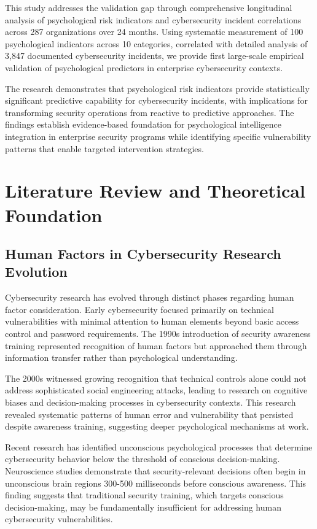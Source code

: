 \documentclass[10pt, twocolumn]{article}
\begin{document}
This study addresses the validation gap through comprehensive longitudinal analysis of psychological risk indicators and cybersecurity incident correlations across 287 organizations over 24 months. Using systematic measurement of 100 psychological indicators across 10 categories, correlated with detailed analysis of 3,847 documented cybersecurity incidents, we provide first large-scale empirical validation of psychological predictors in enterprise cybersecurity contexts.

The research demonstrates that psychological risk indicators provide statistically significant predictive capability for cybersecurity incidents, with implications for transforming security operations from reactive to predictive approaches. The findings establish evidence-based foundation for psychological intelligence integration in enterprise security programs while identifying specific vulnerability patterns that enable targeted intervention strategies.

\section{Literature Review and Theoretical Foundation}

\subsection{Human Factors in Cybersecurity Research Evolution}

Cybersecurity research has evolved through distinct phases regarding human factor consideration. Early cybersecurity focused primarily on technical vulnerabilities with minimal attention to human elements beyond basic access control and password requirements. The 1990s introduction of security awareness training represented recognition of human factors but approached them through information transfer rather than psychological understanding.

The 2000s witnessed growing recognition that technical controls alone could not address sophisticated social engineering attacks, leading to research on cognitive biases and decision-making processes in cybersecurity contexts\cite{beautement2008}. This research revealed systematic patterns of human error and vulnerability that persisted despite awareness training, suggesting deeper psychological mechanisms at work.

Recent research has identified unconscious psychological processes that determine cybersecurity behavior below the threshold of conscious decision-making. Neuroscience studies demonstrate that security-relevant decisions often begin in unconscious brain regions 300-500 milliseconds before conscious awareness\cite{libet1983, soon2008}. This finding suggests that traditional security training, which targets conscious decision-making, may be fundamentally insufficient for addressing human cybersecurity vulnerabilities.
\end{document}
